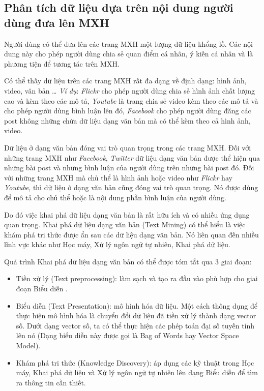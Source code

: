 \documentclass[12pt]{extarticle}
\begin{document}
			\subsection {Phân tích dữ liệu dựa trên nội dung người dùng đưa lên MXH}
			\par Người dùng có thể đưa lên các trang MXH một lượng dữ liệu khổng lồ. Các nội dung này cho phép người dùng chia sẻ quan điểm cá nhân, ý kiến cá nhân và là phương tiện để tương tác trên MXH.
			\par Có thể thấy dữ liệu trên các trang MXH rất đa dạng về định dạng: hình ảnh, video, văn bản … \textit{Ví dụ}: \textit{Flickr} cho phép người dùng chia sẻ hình ảnh chất lượng cao và kèm theo các mô tả, \textit{Youtube} là trang chia sẻ video kèm theo các mô tả và cho phép người dùng bình luận lên đó, \textit{Facebook} cho phép người dùng đăng các post không những chứa dữ liệu dạng văn bản mà có thể kèm theo cả hình ảnh, video.
			\par Dữ liệu ở dạng văn bản đóng vai trò quan trọng trong các trang MXH. Đối với những trang MXH như \textit{Facebook}, \textit{Twitter} dữ liệu dạng văn bản được thể hiện qua những bài post và những bình luận của người dùng trên những bài post đó. Đối với những trang MXH mà chủ thể là hình ảnh hoặc video như \textit{Flickr} hay \textit{Youtube}, thì dữ liệu ở dạng văn bản cũng đóng vai trò quan trọng. Nó được dùng để mô tả cho chủ thể hoặc là nội dung phần bình luận của người dùng.
			\par Do đó việc khai phá dữ liệu dạng văn bản là rất hữu ích và có nhiều ứng dụng quan trọng. Khai phá dữ liệu dạng văn bản (Text Mining) có thể hiểu là việc khám phá tri thức được ẩn sau các dữ liệu dạng văn bản. Nó liên quan đến nhiều lĩnh vực khác như Học máy, Xử lý ngôn ngữ tự nhiên, Khai phá dữ liệu.
			\par Quá trình Khai phá dữ liệu dạng văn bản có thể được tóm tắt qua 3 giai đoạn:
			\begin{itemize}
				\item Tiền xử lý (Text preprocessing): làm sạch và tạo ra đầu vào phù hợp cho giai đoạn Biểu diễn .
				\item Biểu diễn (Text Presentation): mô hình hóa dữ liệu. Một cách thông dụng để thực hiện mô hình hóa là chuyển đổi dữ liệu đã tiền xử lý thành dạng vector số. Dưới dạng vector số, ta có thể thực hiện các phép toán đại số tuyến tính lên nó (Dạng biểu diễn này được gọi là Bag of Words hay Vector Space Model).
				\item Khám phá tri thức (Knowledge Discovery): áp dụng các kỹ thuật trong Học máy, Khai phá dữ liệu và Xử lý ngôn ngữ tự nhiên lên dạng Biểu diễn để tìm ra thông tin cần thiết.
			\end{itemize}
\end{document}
